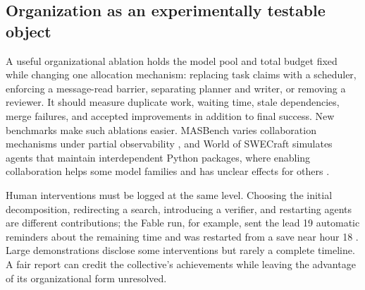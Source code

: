 \subsection{Organization as an experimentally testable object}
A useful organizational ablation holds the model pool and total budget fixed while changing one allocation mechanism: replacing task claims with a scheduler, enforcing a message-read barrier, separating planner and writer, or removing a reviewer. It should measure duplicate work, waiting time, stale dependencies, merge failures, and accepted improvements in addition to final success. New benchmarks make such ablations easier. MASBench varies collaboration mechanisms under partial observability \citep{masbench-2026}, and World of SWECraft simulates agents that maintain interdependent Python packages, where enabling collaboration helps some model families and has unclear effects for others \citep{world-of-swecraft}.

Human interventions must be logged at the same level. Choosing the initial decomposition, redirecting a search, introducing a verifier, and restarting agents are different contributions; the Fable run, for example, sent the lead 19 automatic reminders about the remaining time and was restarted from a save near hour 18 \citep{anthropic-fable-team-scaling}. Large demonstrations disclose some interventions but rarely a complete timeline. A fair report can credit the collective's achievements while leaving the advantage of its organizational form unresolved.
